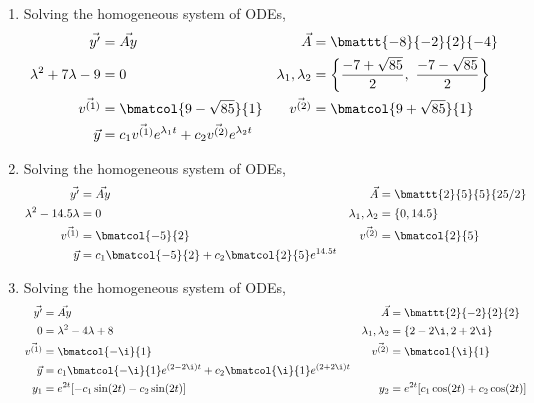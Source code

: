 \begin{enumerate}
    \item Solving the homogeneous system of ODEs,
          \begin{align}
              \vec{y'}                   & = \vec{Ay}                            &
              \vec{A}                    & = \bmattt{-8}{-2}{2}{-4}                \\
              \lambda^{2} + 7\lambda - 9 & = 0                                   &
              \lambda_1, \lambda_2       & = \left\{ \frac{-7 + \sqrt{85}}{2},\
              \frac{-7 - \sqrt{85}}{2} \right\}                                    \\
              \vec{v^{(1)}}              & = \bmatcol{9 - \sqrt{85}}{1}          &
              \vec{v^{(2)}}              & = \bmatcol{9 + \sqrt{85}}{1}            \\
              \vec{y}                    & = c_1 \vec{v^{(1)}} e^{\lambda_1 t}
              + c_2 \vec{v^{(2)}} e^{\lambda_2 t}
          \end{align}

    \item Solving the homogeneous system of ODEs,
          \begin{align}
              \vec{y'}                  & = \vec{Ay}                 &
              \vec{A}                   & = \bmattt{2}{5}{5}{25/2}     \\
              \lambda^{2} - 14.5\lambda & = 0                        &
              \lambda_1, \lambda_2      & = \left\{ 0, 14.5 \right\}   \\
              \vec{v^{(1)}}             & = \bmatcol{-5}{2}          &
              \vec{v^{(2)}}             & = \bmatcol{2}{5}             \\
              \vec{y}                   & = c_1 \bmatcol{-5}{2}
              + c_2 \bmatcol{2}{5} e^{14.5t}
          \end{align}

    \item Solving the homogeneous system of ODEs,
          \begin{align}
              \vec{y'}             & = \vec{Ay}                              &
              \vec{A}              & = \bmattt{2}{-2}{2}{2}                    \\
              0                    & = \lambda^{2} - 4\lambda + 8            &
              \lambda_1, \lambda_2 & = \left\{ 2 - 2 \i, 2 + 2 \i \right\}     \\
              \vec{v^{(1)}}        & = \bmatcol{-\i}{1}                      &
              \vec{v^{(2)}}        & = \bmatcol{\i}{1}                         \\
              \vec{y}              & = c_1 \bmatcol{-\i}{1} e^{(2 - 2 \i)t}
              + c_2 \bmatcol{\i}{1} e^{(2 + 2 \i)t}                            \\
              y_1                  & = e^{2t} [-c_1 \sin(2t) - c_2 \sin(2t)] &
              y_2                  & = e^{2t} [c_1 \cos(2t) + c_2 \cos(2t)]
          \end{align}


\end{enumerate}
